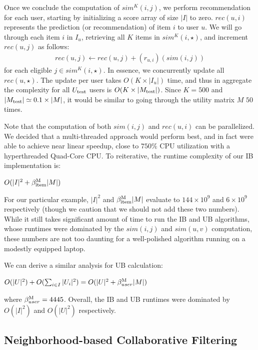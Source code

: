 \documentclass[conference]{IEEEtran}
\begin{document}
Once we conclude the computation of $sim^K(i,j)$, we perform recommendation
for each user, starting by initializing a score array of size $|I|$ to
zero. $rec(u,i)$ represents the prediction (or recommendation)
of item $i$ to user $u$. We will go
through each item $i$ in $I_u$, retrieving all $K$ items in
$sim^K(i,\star)$, and increment $rec(u,j)$ as follows:
\begin{eqnarray*}
rec(u,j) \leftarrow rec(u,j) + \left(r_{u,i}\right)\left(sim(i,j)\right)
\end{eqnarray*}
for each eligible $j \in sim^K(i,\star)$. In essence, we concurrently
update all $rec(u,\star)$.
The update per user takes $O(K\times |I_u|)$ time, and thus
in aggregate the complexity for all $U_{\rm test}$ users is
$O(K\times |M_{\rm test}|)$.
Since $K=500$ and $|M_{\rm test}| \simeq 0.1\times |M|$, it would be
similar to going through the utility matrix $M$ $50$ times.

Note that the computation of both $sim(i,j)$ and $rec(u,i)$ can be
parallelized. We decided that a multi-threaded approach would perform best,
and in fact were able to achieve near linear speedup,
close to $750\%$
CPU utilization with a hyperthreaded Quad-Core CPU.
To reiterative, the runtime complexity of our
IB implementation is:

\hspace{1em}$O(|I|^2 + \beta_{\rm item}^{\rm M} |M|)$

For our particular example, $|I|^2$ and $\beta_{\rm item}^{\rm M} |M|$ evaluate
to  $144\times 10^9$ and $6\times 10^9$ respectively (though we caution that
we should not add these two numbers).
While it still takes significant amount of time to run the IB and UB
algorithms, whose runtimes were dominated by the $sim(i,j)$ and $sim(u,v)$
computation, these numbers are not too daunting for a well-polished
algorithm running on a modestly equipped laptop.

We can derive a similar analysis for UB calculation:

\hspace{1em}$O(|U|^2) + O(\sum_{i\in I}|U_i|^2) = O(|U|^2 + \beta_{user}^{\rm M} |M|)$

where $\beta_{user}^{\rm M} = 4445$.
Overall, the IB and UB runtimes were
dominated by $O(|I|^2)$ and $O(|U|^2)$ respectively. 

\subsection{Neighborhood-based Collaborative Filtering}
\end{document}
